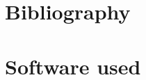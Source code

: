 \section{Bibliography}
\nocite{*}
\section{Software used}
\begin{comment}

\begin{itemize}
\item \textbf{\LaTeX}: used to write and to build the document [\url{https://www.draw.io/}];
\item\textbf{GitHub}: used to store and manage project repository [\url{https://github.com/}];
\item\textbf{GitHub Desktop}: is the official GitHub application which allows us to contribute to the project repository in an easy way [\url{https://desktop.github.com}];
\end{itemize}

\end{comment}

